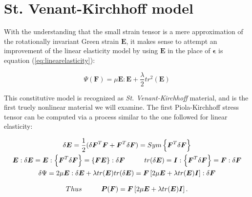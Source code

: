 \section{St. Venant-Kirchhoff model}
With the understanding that the small strain tensor is a mere approximation of the rotationally invariant Green strain $\boldsymbol{E}$, it 
makes sense to attempt an improvement of the linear elasticity model by using $\boldsymbol{E}$ in the place of $\boldsymbol{\epsilon}$ is equation
 (\ref{eq:linearelasticity}):

 \begin{equation}
 \Psi(\mathbf{F}) = \mu\boldsymbol{E}:\boldsymbol{E} + \frac{\lambda}{2}tr^2(\boldsymbol{E})
 \end{equation}

This constitutive model is recognized as \textit{St. Venant-Kirchhoff} material, and is the first truely nonlinear material we will examine. The first
Piola-Kirchhoff stress tensor can be computed via a process similar to the one followed for linear elasticity:

\begin{gather*}
  \delta\boldsymbol{E}=\frac{1}{2} (\delta\boldsymbol{F}^T\boldsymbol{F}+ \boldsymbol{F}^T\delta\boldsymbol{F})=Sym\left\{\boldsymbol{F}^T\delta\boldsymbol{F}\right\}\\
  \boldsymbol{E}:\delta\boldsymbol{E}=\boldsymbol{E}:\left\{\boldsymbol{F}^T\delta\boldsymbol{F}\right\}=\left\{\boldsymbol{FE}\right\}:\delta\boldsymbol{F}
  \hspace{10 mm} tr(\delta\boldsymbol{E})=\boldsymbol{I}:\left\{\boldsymbol{F}^T\delta\boldsymbol{F} \right\}=\boldsymbol{F}:\delta\boldsymbol{F}\\
  \delta\Psi=2\mu\boldsymbol{E}:\delta\boldsymbol{E}+\lambda tr(\boldsymbol{E})tr(\delta\boldsymbol{E})=\boldsymbol{F}\left[2\mu\boldsymbol{E}+\lambda tr(\boldsymbol{E}) \boldsymbol{I} \right]:\delta\boldsymbol{F}
\end{gather*}


\begin{equation}
\label{eq:venantkirchhoff}
Thus \hspace{10 mm} \boldsymbol{P}(\boldsymbol{F})=\boldsymbol{F}\left[2\mu\boldsymbol{E}+\lambda tr(\boldsymbol{E})\boldsymbol{I}\right]. 
\end{equation}

